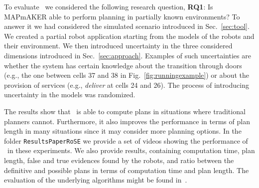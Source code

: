 

To evaluate  \toolName\ we considered the following research question,
\textbf{RQ1}: Is MAPmAKER able to perform planning in partially known environments?
To answer it we  had considered the simulated scenario introduced in Sec.~\ref{sec:tool}.
We created a partial robot application starting from the models of the robots and their environment.
We then introduced uncertainty in the three considered dimensions introduced in Sec.~\ref{sec:approach}.
Examples of such uncertainties are whether the system has certain knowledge about the transition through doors (e.g., the one between cells 37 and 38 in Fig.~\ref{fig:runningexample}) or about the provision of services (e.g., \emph{deliver} at cells 24 and 26).
The process of introducing uncertainty in the models was randomized.

The results show that \toolName~is able to compute plans in situations where traditional planners cannot. 
Furthermore, it also improves the performance in terms of plan length in many situations since it may consider more planning options.
In the folder \texttt{ResultsPaperRoSE} we provide a set of videos showing the performance of \toolName~in these experiments.
We also provide results, containing computation time, plan length, false and true evidences found by the robots, and ratio between the definitive and possible plans in terms of computation time and plan length.
The evaluation of the underlying algorithms might be found in~\cite{menghi2018multi}. 

%
%

